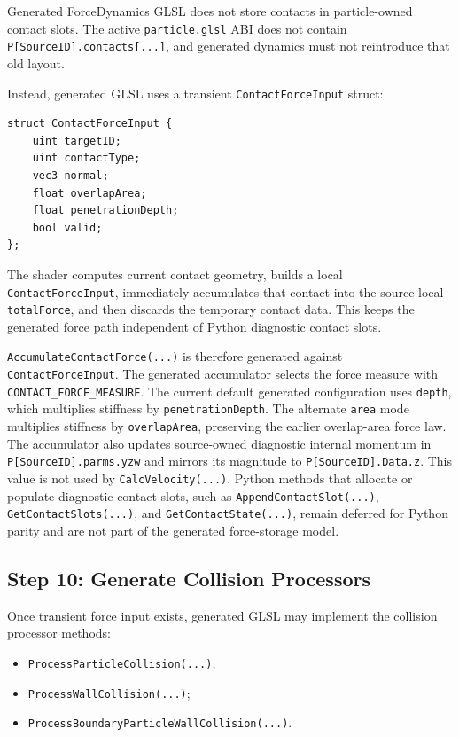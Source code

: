 Generated ForceDynamics GLSL does not store contacts in particle-owned contact
slots.  The active \texttt{particle.glsl} ABI does not contain
\texttt{P[SourceID].contacts[...]}, and generated dynamics must not
reintroduce that old layout.

Instead, generated GLSL uses a transient \texttt{ContactForceInput} struct:
\begin{verbatim}
struct ContactForceInput {
    uint targetID;
    uint contactType;
    vec3 normal;
    float overlapArea;
    float penetrationDepth;
    bool valid;
};
\end{verbatim}

The shader computes current contact geometry, builds a local
\texttt{ContactForceInput}, immediately accumulates that contact into the
source-local \texttt{totalForce}, and then discards the temporary contact data.
This keeps the generated force path independent of Python diagnostic contact
slots.

\texttt{AccumulateContactForce(...)} is therefore generated against
\texttt{ContactForceInput}.  The generated accumulator selects the force
measure with \texttt{CONTACT\_FORCE\_MEASURE}.  The current default generated
configuration uses \texttt{depth}, which multiplies stiffness by
\texttt{penetrationDepth}.  The alternate \texttt{area} mode multiplies
stiffness by \texttt{overlapArea}, preserving the earlier overlap-area force
law.  The accumulator also updates source-owned diagnostic internal momentum
in \texttt{P[SourceID].parms.yzw} and mirrors its magnitude to
\texttt{P[SourceID].Data.z}.  This value is not used by
\texttt{CalcVelocity(...)}.  Python methods that allocate or populate
diagnostic contact slots, such as \texttt{AppendContactSlot(...)},
\texttt{GetContactSlots(...)}, and \texttt{GetContactState(...)}, remain
deferred for Python parity and are not part of the generated force-storage
model.

\subsection{Step 10: Generate Collision Processors}

Once transient force input exists, generated GLSL may implement the collision
processor methods:
\begin{itemize}
    \item \texttt{ProcessParticleCollision(...)};
    \item \texttt{ProcessWallCollision(...)};
    \item \texttt{ProcessBoundaryParticleWallCollision(...)}.
\end{itemize}

